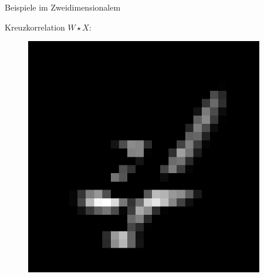 \documentclass[envcountsect, smaller, aspectratio=149]{beamer}
\begin{document}
\begin{frame}{Beispiele im Zweidimensionalem}
\begin{center}
\begin{minipage}[t]{0.3\textwidth}
    \centering
    Kreuzkorrelation $W\star X$:
    \begin{figure}
        \vspace{0.0357\textwidth}
        \includegraphics[width=0.9285\textwidth]{4-convolved.png}
    \end{figure}
\end{minipage}
\end{center}
\end{frame}


\newcommand{\transl}[2]{T_{#1}\, #2}
\end{document}
